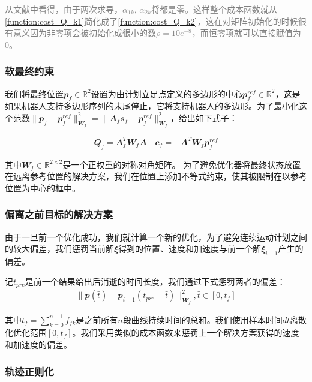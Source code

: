 \textcolor{gray}{\small
    从文献\cite[p]{Goldfarb_Idnani_1983}中看得，由于两次求导，$\alpha_{1k}, \, \alpha_{2k}$将都是零。这样整个成本函数就从\eqref{function:cost_Q_k1}简化成了\eqref{function:cost_Q_k2}，这在对矩阵初始化的时候很有意义因为非零项会被初始化成很小的数$\rho=10e^{-8}$，而恒零项就可以直接赋值为0。
}
\subsubsection{软最终约束\label{subsection:soft_final_constrants}}

我们将最终位置$\mathbfit{p}_f\in\mathbb{R}^2$设置为由计划立足点定义的多边形的中心$\mathbfit{p}_f^{ref}\in\mathbb{R}^2$，这是如果机器人支持多边形序列的末尾停止，它将支持机器人的多边形。为了最小化这个范数$\|\mathbfit{p}_f-\mathbfit{p}_f^{ref}\|^2_{\mathbfit{W}_f}=\|\mathbfit{A}_f\mathbfit{s}_f-\mathbfit{p}_f^{ref}\|^2_{\mathbfit{W}_f}$，给出如下式子：

\begin{align}
    \mathbfit{Q}_f=\mathbfit{A}_f^T \mathbfit{W}_f \mathbfit{A} \quad \mathbfit{c}_f=-\mathbfit{A}^T \mathbfit{W}_f \mathbfit{p}_f^{ref}
\end{align}

其中$\mathbfit{W}_f \in \mathbb{R}^{2\times2}$是一个正权重的对称对角矩阵。
为了避免优化器将最终状态放置在远离参考位置的解决方案，我们在位置上添加不等式约束，使其被限制在以参考位置为中心的框中。

\subsubsection{偏离之前目标的解决方案\label{subsection:deviation_previous}}
由于一旦前一个优化成功，我们就计算一个新的优化，为了避免连续运动计划之间的较大偏差，我们惩罚当前解$\mathbfit{\xi}$得到的位置、速度和加速度与前一个解$\mathbfit{\xi}_{i-1}$产生的偏差。

记$t_{pre}$是前一个结果给出后消逝的时间长度，我们通过下式惩罚两者的偏差：
\begin{align}
    \|\mathbfit{p}(\bar t)-\mathbfit{p}_{i-1}(t_{pre}+\bar t)\|^2_{\mathbfit{W}_f}, \bar t \in[0, t_f]
\end{align}

其中$t_f=\sum_{k=0}^{n-1}f_{fk}$是之前所有$n$段曲线持续时间的总和。我们使用样本时间$dt$离散化优化范围$[0, t_f]$。我们采用类似的成本函数来惩罚上一个解决方案获得的速度和加速度的偏差。

\subsubsection{轨迹正则化}

